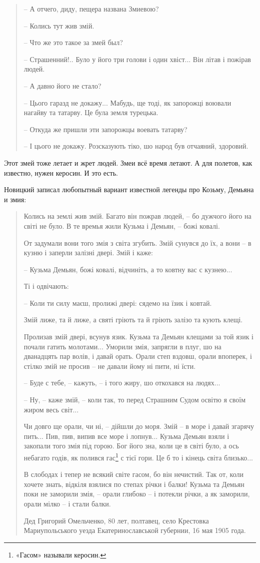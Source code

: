 \begin{quotation}
   – А отчего, диду, пещера названа Змиевою?

   – Колись тут жив змій.

   – Что же это такое за змей был?

   – Страшенний!.. Було у його три голови і один хвіст... Він літав і пожірав людей.

   – А давно його не стало?

   – Цього гаразд не докажу... Мабудь, ще тоді, як запорожці воювали нагайву та татарву. Це була земля турецька.

   – Откуда же пришли эти запорожцы воевать татарву?

   – І цього не докажу. Розсказують тіко, шо народ був отчаяний, здоровий.
\end{quotation}

Этот змей тоже летает и жрет людей. Змеи всё время летают. А для полетов, как известно, нужен керосин. И это есть.

Новицкий записал любопытный вариант известной легенды про Козьму, Демьяна и змия:

\begin{quotation}
Колись на землі жив змій. Багато він пожрав людей, – бо дужчого його на світі не було. В те времья жили Кузьма і Демьян, – божі ковалі.

От задумали вони того змія з світа згубить. Змій сунувся до їх, а вони – в кузню і заперли залізні двері. Змій і каже:

   – Кузьма Демьян, божі ковалі, відчиніть, а то ковтну вас с кузнею...

Ті і одвічають:

   – Коли ти силу маєш, пролижі двері: сядемо на їзик і ковтай.

Змій лиже, та й лиже, а святі гріють та й гріють залізо та кують клещі.

Пролизав змій двері, всунув язик. Кузьма та Демьян клещами за той язик і почали гатить молотами... Уморили змія, запрягли в плуг, шо на дванадцять пар волів, і давай орать. Орали степ вздовш, орали впоперек, і стілко змій не просив – не давали йому ні пити, ні їсти.

   – Буде с тебе, – кажуть, – і того жиру, шо откохався на людях...

   – Ну, – каже змій, – коли так, то перед Страшним Судом освітю я своїм жиром весь світ...

Чи довго ще орали, чи ні, – дійшли до моря. Змій – в море і давай згарячу пить... Пив, пив, випив все море і лопнув... Кузьма Демьян взяли і закопали того змія під горою. Бог його зна, коли це в світі було, а ось небагато годів, як полився гас\footnote{«Гасом» называли керосин.} с тієї гори. Це б то і кінець світа близько...

В слободах і тепер не всякий світе гасом, бо він нечистий. Так от, коли хочете знать, відкіля взялися по степах річки і балки! Кузьма та Демьян поки не заморили змія, – орали глибоко – і потекли річки, а як заморили, орали мілко – і стали балки.

Дед Григорий Омельченко, 80 лет, полтавец, село Крестовка Мариупольського уезда Екатеринославськой губернии, 16 мая 1905 года.
\end{quotation}

